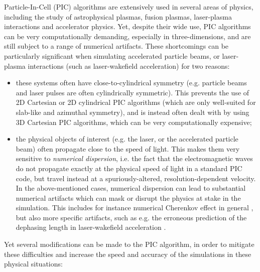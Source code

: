 \documentclass[1p,times,authoryear]{elsarticle}
\begin{document}
Particle-In-Cell (PIC) algorithms \citep{Birdsall2004,Hockney1988} 
are extensively used in several areas of physics, including the study
of astrophysical plasmas, fusion plasmas, laser-plasma
interactions and accelerator physics. Yet,
despite their wide use, PIC algorithms can be very computationally
demanding, especially in three-dimensions, and are still subject to a range of numerical artifacts. 
These shortcomings can be particularly significant when simulating 
accelerated particle beams, or 
laser-plasma interactions (such as laser-wakefield acceleration) for two reasons:
\begin{itemize}
\item 
these systems often have close-to-cylindrical
  symmetry (e.g. particle beams and laser pulses are often
  cylindrically symmetric). This prevents the use of 2D Cartesian 
or 2D cylindrical PIC algorithms (which are only well-suited for slab-like and azimuthal symmetry),
and is instead often dealt with by using
  3D Cartesian PIC algorithms, which can be very 
computationally expensive; 
\item the physical objects of interest (e.g. the laser, or the
  accelerated particle beam) often propagate close to the speed of
  light. This makes them very sensitive to \emph{numerical
    dispersion}, i.e. the fact that the electromagnetic waves do not
  propagate exactly at the physical speed of light in a standard PIC
  code, but travel instead at a spuriously-altered,
  resolution-dependent velocity. In the above-mentioned cases, 
numerical dispersion can lead to substantial numerical artifacts
which can mask or disrupt the physics at stake in the simulation. This
includes for instance numerical Cherenkov effect in general
\citep{GodfreyJCP1974}, but also more specific artifacts, such as
e.g. the erroneous prediction of the dephasing length in
laser-wakefield acceleration \citep{CowanPRSTAB2013}.

\end{itemize}
Yet several modifications can be made to the PIC algorithm, in order
to mitigate these difficulties and increase the speed and
accuracy of the simulations in these physical situations: 
\end{document}
